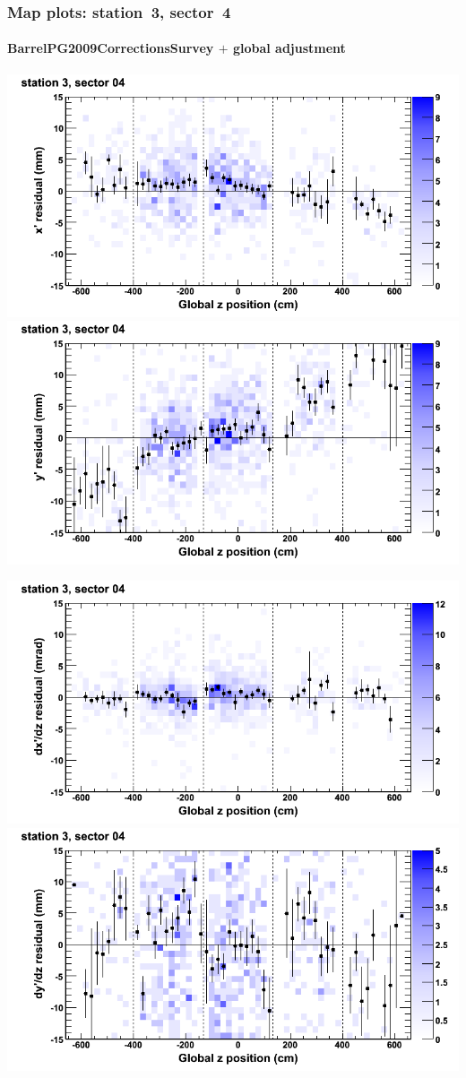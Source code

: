 \documentclass[compress]{beamer}
\begin{document}
\begin{frame}
\frametitle{Map plots: station~3, sector~4}
\framesubtitle{BarrelPG2009CorrectionsSurvey $+$ global adjustment}
\includegraphics[width=0.5\linewidth]{mapplots_re01/DTvsz_st3sec04_x.png}
\includegraphics[width=0.5\linewidth]{mapplots_re01/DTvsz_st3sec04_y.png}

\includegraphics[width=0.5\linewidth]{mapplots_re01/DTvsz_st3sec04_dxdz.png}
\includegraphics[width=0.5\linewidth]{mapplots_re01/DTvsz_st3sec04_dydz.png}
\end{frame}
\end{document}
